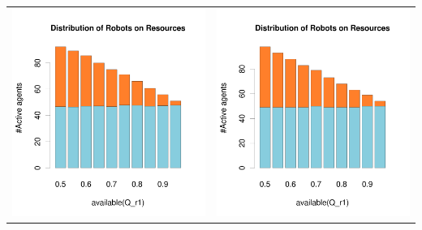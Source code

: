 \documentclass[a4paper,10pt]{article}
\begin{document}
\begin{table}[h!]
\begin{tabular}{cc}
 \newline
 \includegraphics[width=\imgSize]{images/5StaticEnv/barplotAliveR1AndR2_mean_env4}& \includegraphics[width=\imgSize]{images/5StaticEnv/barplotAliveR1AndR2_median_env4}
\end{tabular}
\end{table}
\end{document}
